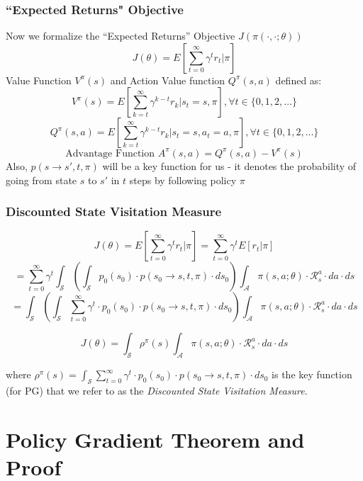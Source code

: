 \documentclass[handout]{beamer}
\begin{document}
\begin{frame}
\frametitle{``Expected Returns" Objective}
\pause
Now we formalize the ``Expected Returns'' Objective $J(\pi(\cdot, \cdot; \theta))$
$$J(\theta) = E[\sum_{t=0}^\infty \gamma^t r_t|\pi]$$
\pause
Value Function $V^{\pi}(s)$ and Action Value function $Q^{\pi}(s,a)$ defined as:
$$V^{\pi}(s) = E[\sum_{k=t}^\infty \gamma^{k-t} r_k|s_t=s, \pi], \forall t \in \{0, 1, 2, \ldots\}$$
$$Q^{\pi}(s,a) = E[\sum_{k=t}^\infty \gamma^{k-t} r_k|s_t=s, a_t=a, \pi], \forall t \in \{0, 1, 2, \ldots\}$$
\pause
$$\mbox{Advantage Function } A^{\pi}(s,a) = Q^{\pi}(s,a) - V^{\pi}(s)$$
\pause
Also, $p(s \rightarrow s', t, \pi)$ will be a key function for us - it denotes the probability of going from state $s$ to $s'$ in $t$ steps by following policy $\pi$
\end{frame}

\begin{frame}
\frametitle{Discounted State Visitation Measure}
\pause
$$J(\theta) = E[\sum_{t=0}^\infty \gamma^t r_t|\pi] = \sum_{t=0}^\infty \gamma^t E[r_t|\pi]$$
\pause
$$ = \sum_{t=0}^\infty \gamma^t \int_{\mathcal{S}} (\int_{\mathcal{S}}  p_0(s_0) \cdot p(s_0 \rightarrow s, t, \pi) \cdot ds_0) \int_{\mathcal{A}} \pi(s,a; \theta) \cdot \mathcal{R}_s^a \cdot da \cdot ds$$
\pause
$$ =  \int_{\mathcal{S}} (\int_{\mathcal{S}}  \sum_{t=0}^\infty \gamma^t \cdot p_0(s_0) \cdot p(s_0 \rightarrow s, t, \pi) \cdot ds_0) \int_{\mathcal{A}} \pi(s,a; \theta) \cdot \mathcal{R}_s^a \cdot da \cdot ds$$
\pause
\begin{definition}
$$J(\theta) =  \int_{\mathcal{S}} \rho^{\pi}(s) \int_{\mathcal{A}} \pi(s,a; \theta) \cdot \mathcal{R}_s^a \cdot da \cdot ds$$
\end{definition}
\pause
where $\rho^{\pi}(s) = \int_{\mathcal{S}}  \sum_{t=0}^\infty \gamma^t \cdot p_0(s_0) \cdot p(s_0 \rightarrow s, t, \pi) \cdot ds_0$ is the key function (for PG) that we refer to as the {\em Discounted State Visitation Measure}.
\end{frame}

\section{Policy Gradient Theorem and Proof}
\end{document}

